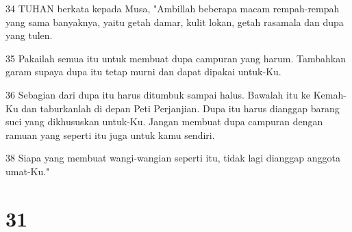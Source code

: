 \par 34 TUHAN berkata kepada Musa, "Ambillah beberapa macam rempah-rempah yang sama banyaknya, yaitu getah damar, kulit lokan, getah rasamala dan dupa yang tulen.
\par 35 Pakailah semua itu untuk membuat dupa campuran yang harum. Tambahkan garam supaya dupa itu tetap murni dan dapat dipakai untuk-Ku.
\par 36 Sebagian dari dupa itu harus ditumbuk sampai halus. Bawalah itu ke Kemah-Ku dan taburkanlah di depan Peti Perjanjian. Dupa itu harus dianggap barang suci yang dikhususkan untuk-Ku. Jangan membuat dupa campuran dengan ramuan yang seperti itu juga untuk kamu sendiri.
\par 38 Siapa yang membuat wangi-wangian seperti itu, tidak lagi dianggap anggota umat-Ku."

\chapter{31}

